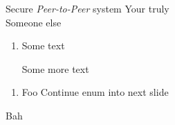 \documentclass[16pt]{projector}
\newcounter{tmpc}
\begin{document}
\begin{slide}
	\vfill
	\begin{center}
		{\Large Secure \emph{Peer-to-Peer} system}
		\vfill
		Your truly\\Someone else
	\end{center}
	\vfill
\end{slide}
\begin{slide}
	\begin{enumerate}
		\item Some text
			\begin{itemize}
				\vfill
				{
				\pitem Some more text
				}
				\vfill
				\vfill
			\end{itemize}
	\end{enumerate}
\end{slide}
\begin{slide}
	\begin{enumerate}
		\item Foo
			\vfill
		\pitem Continue enum into next slide
			\vfill
		\setcounter{tmpc}{\theenumi}
	\end{enumerate}
\end{slide}
\begin{slide}
	\begin{enumerate}
		\setcounter{enumi}{\thetmpc}
		{
		\item Bah
			\vfill
		}
	\end{enumerate}
\end{slide}
\end{document}
